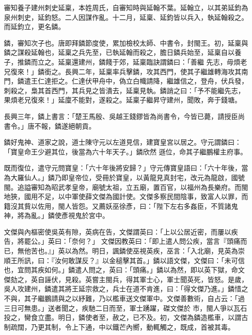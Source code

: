 \begin{pinyinscope}
 審知養子建州刺史延稟，本姓周氏，自審知時與延翰不葉。延翰立，以其弟延鈞為泉州刺史，延鈞怒。二人因謀作亂。十二月，延稟、延鈞皆以兵入，執延翰殺之。而延鈞立，更名鏻。



 鏻，審知次子也。唐即拜鏻節度使，累加檢校太師、中書令，封閩王。初，延稟與鏻之謀殺延翰也，延稟之兵先至，已執延翰而殺之，膽日鏻兵始至，延稟自以養子，推鏻而立之。延稟還建州，鏻餞于郊，延稟臨訣謂鏻曰：「善繼
 先志，毋煩老兄復來！」鏻銜之。長興二年，延稟率兵擊鏻，攻其西門，使其子繼雄轉海攻其南門，鏻遣王仁達拒之。仁達伏甲舟中，偽立白幟請降，繼雄信之，登舟，伏兵發，刺殺之，梟其首西門，其兵見之皆潰去，延稟見執。鏻誚之曰：「予不能繼先志，果煩老兄復來！」延廩不能對，遂殺之。延稟子繼昇守建州，聞敗，奔于錢塘。



 長興三年，鏻上書言：「楚王馬殷、吳越王錢鏐皆為尚書令，今皆已薨，請授臣尚書令。」唐不報，鏻遂絕朝貢。



 鏻好鬼神、道家之說，道士陳守元以左道見信，建寶皇宮以居之。守元謂鏻曰：「寶皇命王少避其位，後當為六十年天子。」鏻欣然
 遜位，命其子繼鵬權主府事。



 既而復位，遣守元問寶皇：「六十年後將安歸？」守元傳寶皇語曰：「六十年後，當為大羅仙人。」鏻乃即皇帝位，受冊於寶皇，以黃龍見真封宅，改元為龍啟，國號閩。追謚審知為昭武孝皇帝，廟號太祖，立五廟，置百官，以福州為長樂府。而閩地狹，國用不足，以中軍使薛文傑為國計使。文傑多察民間陰事，致富人以罪，而籍沒其貲以佐用，閩人皆怨。又薦妖巫徐彥，曰：「陛下左右多姦臣，不質諸鬼神，將為亂。」鏻使彥視鬼於宮中。



 文傑與內樞密使吳英有隙，英病在告，文傑謂英曰：「上以公居近密，而屢以疾告，將罷公。」英曰：「奈何？」
 文傑因教英曰：「即上遣人問公疾，當言『頭痛而已，無他苦也。』」英以為然。明日，諷鏻使巫視英疾，巫言：「入北廟，見英為崇順王所訊，曰：『汝何敢謀反？』以金槌擊其首。」鏻以語文傑，文傑曰：「未可信也，宜問其疾如何。」鏻遣人問之，英曰：「頭痛。」鏻以為然，即以英下獄，命文傑劾之，英自誣伏，見殺。英嘗主閩兵，得其軍士心，軍士聞英死，皆怒。是歲，吳人攻建州，鏻遣其將王延宗救之，兵士在道不肯進，曰：「得文傑乃進。」鏻惜之不與，其子繼鵬請與之以紓難，乃以檻車送文傑軍中。文傑善數術，自占云：「過三日可無患。」送者聞之，疾馳二日而至，軍士踴躍，磔文傑於
 市，閩人爭以瓦石投之，臠食立盡。明日，鏻使者至，赦之，已不及。初，文傑為鏻造檻車，以謂古制疏闊，乃更其制，令上下通，中以鐵芒內嚮，動輒觸之，既成，首被其毒。




\end{pinyinscope}
